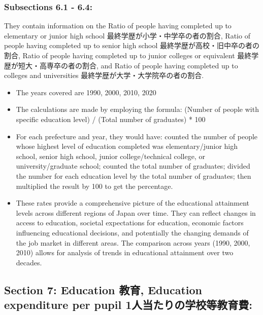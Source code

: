 \documentclass[
  12pt,
  letterpaper,
  DIV=11,
  numbers=noendperiod]{scrartcl}
\begin{document}
\hypertarget{subsections-6.1---6.4}{%
\subsubsection{Subsections 6.1 - 6.4:}\label{subsections-6.1---6.4}}

They contain information on the Ratio of people having completed up to
elementary or junior high school 最終学歴が小学・中学卒の者の割合, Ratio
of people having completed up to senior high school
最終学歴が高校・旧中卒の者の割合, Ratio of people having completed up to
junior colleges or equivalent 最終学歴が短大・高専卒の者の割合, and
Ratio of people having completed up to colleges and universities
最終学歴が大学・大学院卒の者の割合.

\begin{itemize}
\item
  The years covered are 1990, 2000, 2010, 2020
\item
  The calculations are made by employing the formula: (Number of people
  with specific education level) / (Total number of graduates) * 100
\item
  For each prefecture and year, they would have: counted the number of
  people whose highest level of education completed was
  elementary/junior high school, senior high school, junior
  college/technical college, or university/graduate school; counted the
  total number of graduates; divided the number for each education level
  by the total number of graduates; then multiplied the result by 100 to
  get the percentage.
\item
  These rates provide a comprehensive picture of the educational
  attainment levels across different regions of Japan over time. They
  can reflect changes in access to education, societal expectations for
  education, economic factors influencing educational decisions, and
  potentially the changing demands of the job market in different areas.
  The comparison across years (1990, 2000, 2010) allows for analysis of
  trends in educational attainment over two decades.
\end{itemize}

\hypertarget{section-7-education-ux6559ux80b2-education-expenditure-per-pupil-1ux4ebaux5f53ux305fux308aux306eux5b66ux6821ux7b49ux6559ux80b2ux8cbb}{%
\subsection{Section 7: Education 教育, Education expenditure per pupil
1人当たりの学校等教育費:}\label{section-7-education-ux6559ux80b2-education-expenditure-per-pupil-1ux4ebaux5f53ux305fux308aux306eux5b66ux6821ux7b49ux6559ux80b2ux8cbb}}
\end{document}
